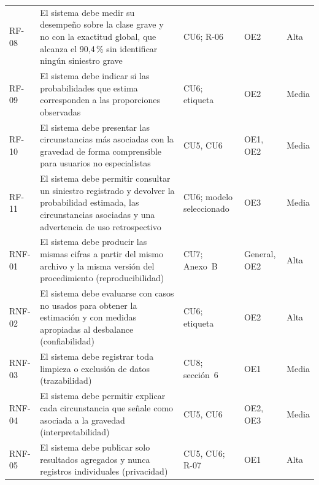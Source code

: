 \begin{longtable}{p{1.2cm}p{7.0cm}p{2.4cm}p{1.6cm}p{1.2cm}}
RF-08 & El sistema debe medir su desempeño sobre la clase grave y no con la exactitud global, que alcanza el 90,4\,\% sin identificar ningún siniestro grave & CU6; R-06 & OE2 & Alta \\
RF-09 & El sistema debe indicar si las probabilidades que estima corresponden a las proporciones observadas & CU6; etiqueta & OE2 & Media \\
RF-10 & El sistema debe presentar las circunstancias más asociadas con la gravedad de forma comprensible para usuarios no especialistas & CU5, CU6 & OE1, OE2 & Media \\
RF-11 & El sistema debe permitir consultar un siniestro registrado y devolver la probabilidad estimada, las circunstancias asociadas y una advertencia de uso retrospectivo & CU6; modelo seleccionado & OE3 & Media \\
RNF-01 & El sistema debe producir las mismas cifras a partir del mismo archivo y la misma versión del procedimiento (reproducibilidad) & CU7; Anexo~B & General, OE2 & Alta \\
RNF-02 & El sistema debe evaluarse con casos no usados para obtener la estimación y con medidas apropiadas al desbalance (confiabilidad) & CU6; etiqueta & OE2 & Alta \\
RNF-03 & El sistema debe registrar toda limpieza o exclusión de datos (trazabilidad) & CU8; sección~6 & OE1 & Media \\
RNF-04 & El sistema debe permitir explicar cada circunstancia que señale como asociada a la gravedad (interpretabilidad) & CU5, CU6 & OE2, OE3 & Media \\
RNF-05 & El sistema debe publicar solo resultados agregados y nunca registros individuales (privacidad) & CU5, CU6; R-07 & OE1 & Alta \\
\end{longtable}
